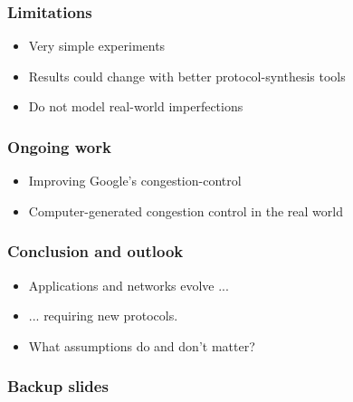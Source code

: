 \documentclass[svgnames]{beamer}
\begin{document}
\begin{Large}
\begin{frame}
\frametitle{Limitations}
\begin{itemize}
\item<2-> Very simple experiments
\item<3-> Results could change with better protocol-synthesis tools
\item<4-> Do not model real-world imperfections
\end{itemize}
\end{frame}
\begin{frame}

\frametitle{Ongoing work}
\begin{itemize}
\item<2-> Improving Google's congestion-control
\item<3-> Computer-generated congestion control in the real world
\end{itemize}
\end{frame}

\begin{frame}
\frametitle{Conclusion and outlook}
\begin{itemize}
\item<2-> Applications and networks evolve ...
\item<3-> ... requiring new protocols.
\item<4-> What assumptions do and don't matter?
\end{itemize}
\end{frame}

\end{Large}

\begin{frame}
\frametitle{Backup slides}
\end{frame}







\end{document}
